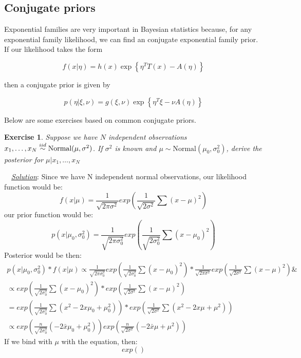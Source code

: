 \documentclass[twoside]{article}
\newcounter{lecnum}
\newtheorem{exercise}{Exercise}[lecnum]
\newenvironment{solution}{
  \begin{flushleft} \noindent ~~\underline{\emph{Solution}}: \rmfamily}{\end{flushleft}}
\begin{document}
\subsection{Conjugate priors}

Exponential families are very important in Bayesian statistics because, for any exponential family likelihood, we can find an conjugate exponential family prior. If our likelihood takes the form

$$f(x|\eta) = h(x)\exp\left\{\eta^TT(x) - A(\eta)\right\}$$

then a conjugate prior is given by

$$p(\eta|\xi,\nu) = g(\xi,\nu)\exp\left\{\eta^T\xi - \nu A(\eta)\right\}$$

Below are some exercises based on common conjugate priors.

\begin{exercise}
  Suppose we have $N$ independent observations $x_1,\dots, x_N \stackrel{\small{iid}}{\sim}\mbox{Normal}(\mu, \sigma^2)$. If $\sigma^2$ is known and $\mu\sim \mbox{Normal}(\mu_0,\sigma_0^2)$, derive the posterior for $\mu|x_1,\dots, x_N$
\end{exercise}


\begin{solution}
Since we have N independent normal observations, our likelihood function would be:
\begin{equation*}
f(x|\mu) = \frac{1}{\sqrt{2\pi\sigma^2}}{exp(\frac{1}{\sqrt{2\sigma^2}}\sum(x-\mu)^2)}
\end{equation*}
our prior function would be:
\begin{equation*}
p(x|\mu_0, \sigma_0^2) = \frac{1}{\sqrt{2\pi\sigma_0^2}}{exp(\frac{1}{\sqrt{2\sigma_0^2}}\sum(x-\mu_0)^2)}
\end{equation*}
Posterior would be then:
\begin{equation*}
\begin{split}
p(x|\mu_0, \sigma_0^2) * f(x|\mu) \propto  \frac{1}{\sqrt{2\pi\sigma_0^2}}{exp(\frac{1}{\sqrt{2\sigma_0^2}}\sum(x-\mu_0)^2)} *  \frac{1}{\sqrt{2\pi\sigma^2}}{exp(\frac{1}{\sqrt{2\sigma^2}}\sum(x-\mu)^2)} \& \\\propto {exp(\frac{1}{\sqrt{2\sigma_0^2}}\sum(x-\mu_0)^2)} *{exp(\frac{1}{\sqrt{2\sigma^2}}\sum(x-\mu)^2)}
\\ = exp(\frac{1}{\sqrt{2\sigma_0^2}}\sum(x^2-2x\mu_0+\mu_0^2)) * {exp(\frac{1}{\sqrt{2\sigma^2}}\sum(x^2 -2x\mu+\mu^2))}
\\ \propto exp(\frac{n}{\sqrt{2\sigma_0^2}}(-2\bar{x}\mu_{0}+\mu_0^2))  {exp(\frac{n}{\sqrt{2\sigma^2}}(-2\bar{x}\mu+\mu^2))}
\end{split}
\end{equation*}
If we bind with $\mu$ with the equation, then: 
\begin{equation}
exp()
\end{equation}

\end{solution}
\end{document}
